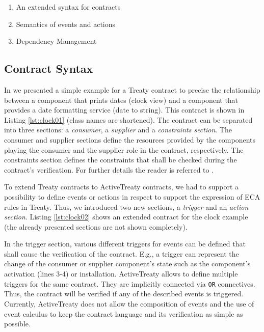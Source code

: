 \documentclass{llncs}
\begin{document}
\begin{enumerate}
  \item An extended syntax for contracts
  \item Semantics of events and actions
  \item Dependency Management
\end{enumerate}


\subsection{Contract Syntax}

In \cite{Treaty.JOT2009} we presented a simple example for a Treaty contract to precise the relationship between a component that prints
dates (clock view) and a component that provides a date formatting service (date to string). This contract is shown in Listing \ref{lst:clock01} (class names are shortened). The contract can be separated into three sections: a \textit{consumer}, a \textit{supplier} and a \textit{constraints section}. The consumer and supplier sections define the resources provided by the components playing the consumer and the supplier role in the contract, respectively. The constraints section defines the constraints that shall be checked during the contract's verification. For further details the reader is referred to \cite{Treaty.JOT2009}.

\begin{figure}[htbp]
\lstset{ 
  language=XML,
  caption=A contract for the clock example.,
  label=lst:clock01
}

\end{figure}

To extend Treaty contracts to ActiveTreaty contracts, we had to support a possibility to define events or actions in respect to support the expression of ECA rules in Treaty. Thus, we introduced two new sections, a \textit{trigger} and an \textit{action section}. Listing \ref{lst:clock02} shows an extended contract for the clock example (the already presented sections are not shown completely).

\begin{figure}[htbp]
\lstset{ 
  language=XML,
  caption=A contract for the clock example including triggers and actions.,
  label=lst:clock02
}

\end{figure}

In the trigger section, various different triggers for events can be defined that shall cause the verification of the contract. E.g., a trigger can represent the change of the consumer or supplier component's state such as the component's activation (lines 3-4) or installation. ActiveTreaty allows to define multiple triggers for the same contract. They are implicitly connected via \texttt{OR} connectives. Thus, the contract will be verified if any of the described events is triggered. Currently, ActiveTreaty does not allow the composition of events and the use of event calculus to keep the contract language and its verification as simple as possible.
\end{document}
